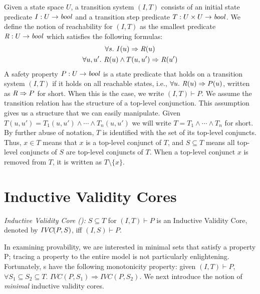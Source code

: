 Given a state space $U$, a transition system $(I,T)$ consists of an
initial state predicate $I : U \to \mathit{bool}$ and a transition step
predicate $T : U \times U \to \mathit{bool}$. We define the notion of
reachability for $(I, T)$ as the smallest predicate $\mathit{R} : U \to
\mathit{bool}$ which satisfies the following formulas:
\begin{gather*}
  \forall s.~ I(u) \Rightarrow \mathit{R}(u) \\
  \forall u, u'.~ \mathit{R}(u) \land T(u, u') \Rightarrow \mathit{R}(u')
\end{gather*}
A safety property $P : U \to \mathit{bool}$ is a state predicate that holds on a transition system $(I, T)$ if it holds on all
reachable states, i.e., $\forall u.~ \mathit{R}(u) \Rightarrow P(u)$,
written as $\mathit{R} \Rightarrow P$ for short. When this is the case, we
write $(I, T)\vdash P$. We assume the transition relation has the structure of a top-level conjunction. This assumption gives us a structure that we can easily manipulate. Given $T(u, u') = T_1(u, u') \land \cdots \land T_n(u, u')$ we will write $T = T_1 \land \cdots \land T_n$ for short.
By further abuse of notation,
$T$ is identified with the set of its top-level conjuncts. Thus, $x \in
T$ means that $x$ is a top-level conjunct of $T$, and $S
\subseteq T$ means all top-level conjuncts of $S$ are top-level
conjuncts of $T$. When a top-level conjunct $x$ is removed from $T$, it is written as $T \setminus \{x\}$.


%
\section{Inductive Validity Cores}

\begin{definition}{\emph {Inductive Validity Core (\ivc):}}
  \label{def:ivc}
  $S \subseteq T$ for $(I, T)\vdash P$ is an Inductive Validity Core,
  denoted by $\textit{IVC}(P, S)$, iff $(I, S) \vdash P $.
\end{definition}

In examining provability, we are interested in minimal sets
that satisfy a property P; tracing a property to the entire model
is not particularly enlightening.  Fortunately, \ivc s have
the following monotonicity property: given $(I, T)\vdash P$, $\forall S_1 \subseteq S_2 \subseteq T$. $IVC(P, S_1) \Rightarrow IVC(P, S_2)$.  We next introduce the notion of {\em minimal} inductive validity cores.

